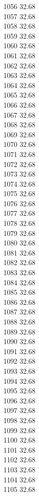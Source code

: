1056	32.68\\
1057	32.68\\
1058	32.68\\
1059	32.68\\
1060	32.68\\
1061	32.68\\
1062	32.68\\
1063	32.68\\
1064	32.68\\
1065	32.68\\
1066	32.68\\
1067	32.68\\
1068	32.68\\
1069	32.68\\
1070	32.68\\
1071	32.68\\
1072	32.68\\
1073	32.68\\
1074	32.68\\
1075	32.68\\
1076	32.68\\
1077	32.68\\
1078	32.68\\
1079	32.68\\
1080	32.68\\
1081	32.68\\
1082	32.68\\
1083	32.68\\
1084	32.68\\
1085	32.68\\
1086	32.68\\
1087	32.68\\
1088	32.68\\
1089	32.68\\
1090	32.68\\
1091	32.68\\
1092	32.68\\
1093	32.68\\
1094	32.68\\
1095	32.68\\
1096	32.68\\
1097	32.68\\
1098	32.68\\
1099	32.68\\
1100	32.68\\
1101	32.68\\
1102	32.68\\
1103	32.68\\
1104	32.68\\
1105	32.68\\
